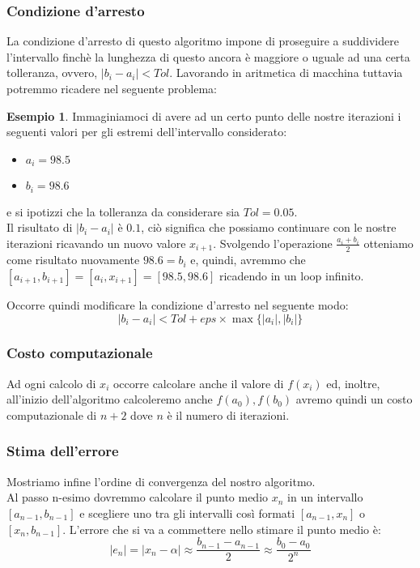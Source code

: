 \documentclass[12pt, a4paper]{book}
\theoremstyle{definition}
\newtheorem{exmp}{Esempio}[section]
\begin{document}
\begin{flushleft}
\subsubsection{Condizione d'arresto}
La condizione d'arresto di questo algoritmo impone di proseguire a suddividere l'intervallo finchè la lunghezza di questo ancora è maggiore o uguale ad una certa tolleranza, ovvero, $|b_{i} - a_{i}| < Tol$.
Lavorando in aritmetica di macchina tuttavia potremmo ricadere nel seguente problema: 
\begin{exmp}
Immaginiamoci di avere ad un certo punto delle nostre iterazioni i seguenti valori per gli estremi dell'intervallo considerato: 
\begin{itemize}
	\item $a_{i} = 98.5$
	\item $b_{i} = 98.6$
\end{itemize}
e si ipotizzi che la tolleranza da considerare sia $Tol = 0.05$. \\
Il risultato di $|b_{i} - a_{i}|$  è $0.1$, ciò significa che possiamo continuare con le nostre iterazioni ricavando un nuovo valore  $x_{i + 1}$.  Svolgendo l'operazione $\frac{a_{i}+b_{i}}{2}$ otteniamo come risultato nuovamente $98.6 = b_{i}$ e, quindi, avremmo che $[a_{i+1}, b_{i+1}] = [a_{i}, x_{i+1}] = [98.5,98.6]$ ricadendo in un loop infinito. 
\end{exmp}
Occorre quindi modificare la condizione d'arresto nel seguente modo: 
\[ 
	|b_{i} - a_{i}| < Tol + eps \times \max \{|a_{i}|, |b_{i}|\}
\]

\subsubsection{Costo computazionale}
Ad ogni calcolo di $x_{i}$ occorre calcolare anche il valore di $f(x_{i})$ ed, inoltre, all'inizio dell'algoritmo calcoleremo anche $f(a_{0}),f(b_{0})$ avremo quindi un costo computazionale di $n+2$ dove $n$ è il numero di iterazioni.


\subsubsection{Stima dell'errore}
Mostriamo infine l'ordine di convergenza del nostro algoritmo. \\
Al passo n-esimo dovremmo calcolare il punto medio $x_{n}$ in un intervallo $[a_{n-1}, b_{n-1}]$ e scegliere uno tra gli intervalli così formati $[a_{n-1},x_{n}]$ o $[x_{n},b_{n-1}]$.
L'errore che si va a commettere nello stimare il punto medio è:
\[
	|e_{n}| = | x_{n} - \alpha | \approx \frac{b_{n-1} - a_{n-1}}{2} \approx  \frac{b_{0} - a_{0}}{2^{n}}
\]


\end{flushleft}
\end{document}
